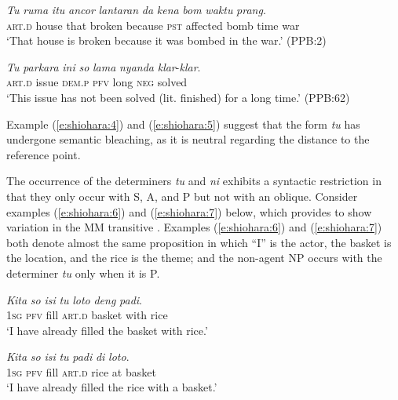 \documentclass[output=paper
,modfonts
,nonflat]{langsci/langscibook}
\begin{document}
\begin{exe}
	\ex\label{e:shiohara:4}
	\gll \textit{Tu} \textit{ruma} \textit{itu} \textit{ancor} \textit{lantaran} \textit{da} \textit{kena} \textit{bom} \textit{waktu} \textit{prang}.\\
	\textsc{art.d} house that broken because \textsc{pst} affected bomb time war\\
	\glt ‘That house is broken because it was bombed in the war.’ \hfill{(PPB:2)}
\end{exe}

\begin{exe}
	\ex\label{e:shiohara:5}
	\gll \textit{Tu} \textit{parkara} \textit{ini} \textit{so} \textit{lama} \textit{nyanda} \textit{klar}-\textit{klar}.\\
	\textsc{art.d} issue \textsc{dem.p} \textsc{pfv} long \textsc{neg} solved\\
	\glt ‘This issue has not been solved (lit. finished) for a long time.’ \hfill{(PPB:62)}
\end{exe}

\noindent
Example (\ref{e:shiohara:4}) and (\ref{e:shiohara:5}) suggest that the form \textit{tu} has undergone semantic bleaching, as it is neutral regarding the distance to the reference point.

The occurrence of the determiners \textit{tu} and \textit{ni} exhibits a syntactic restriction in that they only occur with S, A, and P but not with an oblique. Consider examples (\ref{e:shiohara:6}) and (\ref{e:shiohara:7}) below, which \citet[430]{Prentice1994} provides to show  variation in the MM transitive . Examples (\ref{e:shiohara:6}) and (\ref{e:shiohara:7}) both denote almost the same proposition in which “I” is the actor, the basket is the location, and the rice is the theme; and the non-agent NP occurs with the determiner \textit{tu} only when it is P.

\begin{exe}
	\ex\label{e:shiohara:6}
	\gll \textit{Kita} \textit{so}  \textit{isi}  \textit{tu}  \textit{loto}  \textit{deng}  \textit{padi}.\\
	\textsc{1sg}  \textsc{pfv}  fill  \textsc{art.d}  basket  with  rice\\
	\glt ‘I have already filled the basket with rice.’
\end{exe}

\begin{exe}
	\ex\label{e:shiohara:7}
	\gll \textit{Kita}  \textit{so}  \textit{isi}  \textit{tu}  \textit{padi}  \textit{di}  \textit{loto}.\\
	\textsc{1sg}  \textsc{pfv}  fill  \textsc{art.d}  rice  at  basket\\
	\glt ‘I have already filled the rice with a basket.’
\end{exe}
\end{document}

